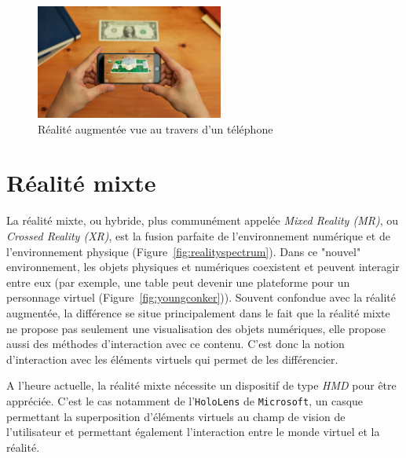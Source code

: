 \begin{figure}[H]
\centering
\includegraphics[width=0.55\textwidth]{images/AR}
\caption{Réalité augmentée vue au travers d'un téléphone\protect\footnotemark}\label{fig:AR}
\end{figure}

\section{Réalité mixte}
\label{sec:MR}
La réalité mixte\cite{ohta2014mixed}, ou hybride, plus communément appelée \emph{Mixed Reality (MR)}, ou \emph{Crossed Reality (XR)}, est la fusion parfaite de l'environnement numérique et de l'environnement physique (Figure~\ref{fig:realityspectrum}). Dans ce "nouvel" environnement, les objets physiques et numériques coexistent et peuvent interagir entre eux (par exemple, une table peut devenir une plateforme pour un personnage virtuel (Figure~\ref{fig:youngconker})). Souvent confondue avec la réalité augmentée, la différence se situe principalement dans le fait que la réalité mixte ne propose pas seulement une visualisation des objets numériques, elle propose aussi des méthodes d'interaction avec ce contenu. C'est donc la notion d'interaction avec les éléments virtuels qui permet de les différencier. 

A l'heure actuelle, la réalité mixte nécessite un dispositif de type \emph{HMD} pour être appréciée. C'est le cas notamment de l'\texttt{HoloLens} de \texttt{Microsoft}, un casque permettant la superposition d'éléments virtuels au champ de vision de l'utilisateur et permettant également l'interaction entre le monde virtuel et la réalité.

